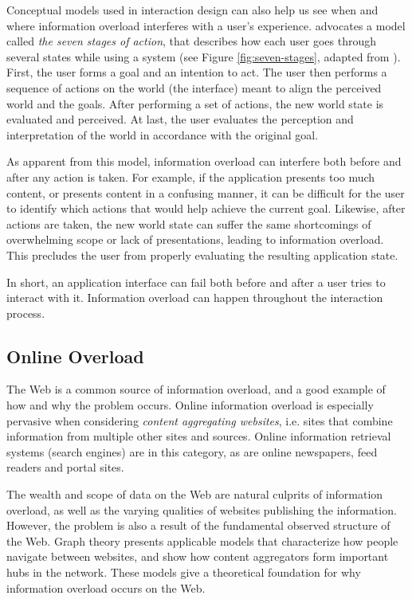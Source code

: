 Conceptual models used in interaction design can also help us see when and where information overload interferes with a user's experience. 
\cite{Norman1988} advocates a model called \emph{the seven stages of action}, 
that describes how each user goes through several states while using a system
(see Figure \ref{fig:seven-stages}, adapted from \cite{Norman1988}). 
First, the user forms a goal and an intention to act. The user then performs a sequence of actions on the world (the interface)
 meant to align the perceived world and the goals. After performing a set of actions, the new world state is evaluated and perceived. 
At last, the user evaluates the perception and interpretation of the world in accordance with the original goal.

As apparent from this model, information overload can interfere both before and after any action is taken. 
For example, if the application presents too much content, or presents content in a confusing manner, 
it can be difficult for the user to identify which actions that would help achieve the current goal. 
Likewise, after actions are taken, the new world state can suffer the same shortcomings of overwhelming scope or lack of presentations, 
leading to information overload. 
This precludes the user from properly evaluating the resulting application state. 

In short, an application interface can fail both before and after a user tries to interact with it.
Information overload can happen throughout the interaction process.


\subsection{Online Overload}

The Web is a common source of information overload, 
and a good example of how and why the problem occurs.
Online information overload is especially pervasive when considering \emph{content aggregating websites}, i.e.
sites that combine information from multiple other sites and sources. 
Online information retrieval systems (search engines) are in this category, as are
online newspapers, feed readers and portal sites.

The wealth and scope of data on the Web are natural culprits of information overload, 
as well as the varying qualities of websites publishing the information. 
However, the problem is also a result of the fundamental observed structure of the Web.
Graph theory presents applicable models that characterize how people navigate between websites, 
and show how content aggregators form important hubs in the network. 
These models give a theoretical foundation for why information overload occurs on the Web.

